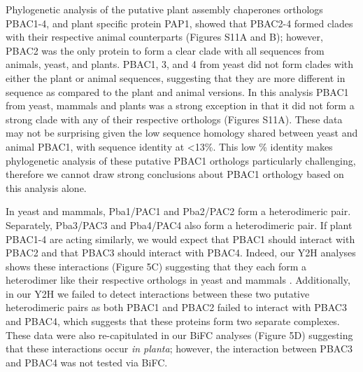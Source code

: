 Phylogenetic analysis of the putative plant assembly chaperones orthologs PBAC1-4, and plant specific protein PAP1, showed that PBAC2-4 formed clades with their respective animal counterparts (Figures S11A and B); however, PBAC2 was the only protein to form a clear clade with all sequences from animals, yeast, and plants. PBAC1, 3, and 4 from yeast did not form clades with either the plant or animal sequences, suggesting that they are more different in sequence as compared to the plant and animal versions. In this analysis PBAC1 from yeast, mammals and plants was a strong exception in that it did not form a strong clade with any of their respective orthologs (Figures S11A). These data may not be surprising given the low sequence homology shared between yeast and animal PBAC1, with sequence identity at <13\%. This low \% identity makes phylogenetic analysis of these putative PBAC1 orthologs particularly challenging, therefore we cannot draw strong conclusions about PBAC1 orthology based on this analysis alone. 

In yeast and mammals, Pba1/PAC1 and Pba2/PAC2 form a heterodimeric pair. Separately, Pba3/PAC3 and Pba4/PAC4 also form a heterodimeric pair. If plant PBAC1-4 are acting similarly, we would expect that PBAC1 should interact with PBAC2 and that PBAC3 should interact with PBAC4.  Indeed, our Y2H analyses shows these interactions (Figure 5C) suggesting that they each form a heterodimer like their respective orthologs in yeast and mammals \citep{kunjappu14}. Additionally, in our Y2H we failed to detect interactions between these two putative heterodimeric pairs as both PBAC1 and PBAC2 failed to interact with PBAC3 and PBAC4, which suggests that these proteins form two separate complexes. These data were also re-capitulated in our BiFC analyses (Figure 5D) suggesting that these interactions occur \textit{in planta}; however, the interaction between PBAC3 and PBAC4 was not tested via BiFC.

